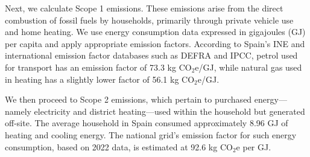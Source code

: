 \documentclass[12pt,a4paper]{article}%
\begin{document}
Next, we calculate Scope 1 emissions. These emissions arise from the direct combustion of fossil fuels by households, primarily through private vehicle use and home heating. We use energy consumption data expressed in gigajoules (GJ) per capita and apply appropriate emission factors. According to Spain’s INE and international emission factor databases such as DEFRA and IPCC, petrol used for transport has an emission factor of 73.3 kg CO$_2$e/GJ, while natural gas used in heating has a slightly lower factor of 56.1 kg CO$_2$e/GJ.


\begin{table}[h]
\centering
\caption{Direct Emissions from Household Energy and Transport (Scope 1)}\label{tab:scope1}
\end{table}


We then proceed to Scope 2 emissions, which pertain to purchased energy—namely electricity and district heating—used within the household but generated off-site. The average household in Spain consumed approximately 8.96 GJ of heating and cooling energy. The national grid's emission factor for such energy consumption, based on 2022 data, is estimated at 92.6 kg CO$_2$e per GJ.

\begin{table}[h]
\centering
\caption{Indirect Emissions from Heating and Cooling (Scope 2)}\label{tab:scope2}
\end{table}
\end{document}
